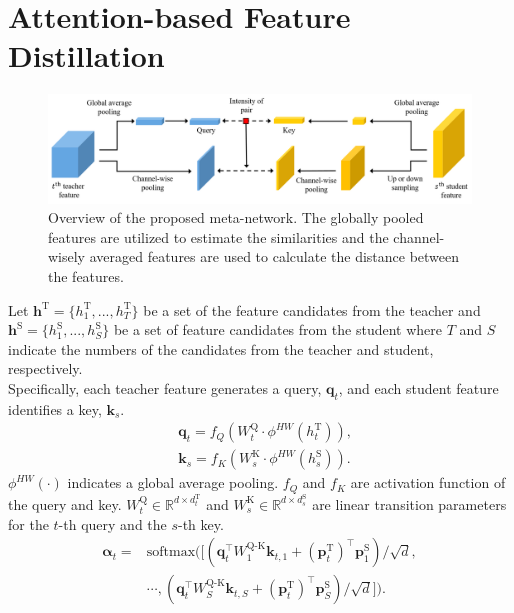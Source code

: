 \documentclass{article}
\begin{document}
	\section{Attention-based Feature Distillation}
	\begin{figure}[t]
		\centering
		\includegraphics[width=\columnwidth]{figure/Figure2_intensity.png}
		\caption{Overview of the proposed meta-network. The globally pooled features are utilized to estimate the similarities and the channel-wisely averaged features are used to calculate the distance between the features.}
		\label{fig:method}
	\end{figure}
	Let $\mathbf{h}^{\text{T}}=\{{h}^{\text{T}}_1, ..., {h}^{\text{T}}_T\}$ be a set of the feature candidates from the teacher and $\mathbf{h}^{\text{S}}=\{{h}^{\text{S}}_1, ..., {h}^{\text{S}}_S\}$ be a set of feature candidates from the student where $T$ and $S$ indicate the numbers of the candidates from the teacher and student, respectively.\\
	Specifically, each teacher feature generates a query, $\mathbf{q}_t$, and each student feature identifies a key, $\mathbf{k}_{s}$. \\
	\begin{equation}
		\begin{aligned}
			& \mathbf{q}_t = f_Q ( W^{\text{Q}}_t \cdot \phi^{HW}({h}^{\text{T}}_t) ), \\
			& \mathbf{k}_{s} = f_K ( W^{\text{K}}_s \cdot \phi^{HW}({h}^{\text{S}}_s) ).
		\end{aligned}
	\end{equation}
	$\phi^{HW}( \cdot )$ indicates a global average pooling. $f_Q$ and $f_K$ are activation function of the query and key. $W^{\text{Q}}_t \in \mathbb{R}^{d \times d^{\text{T}}_t}$ and $W^{\text{K}}_s \in \mathbb{R}^{d \times d^{\text{S}}_s}$ are linear transition parameters for the $t$-th query and the $s$-th key.\\
	\begin{equation}
		\begin{aligned}
			\mathbf{\alpha}_t={}&\text{softmax} ( [(\mathbf{q}_t^\top W_1^ {\text{Q-K}} \mathbf{k}_{t,1} + (\mathbf{p}_t^{\text{T}})^\top \mathbf{p}_{1}^{\text{S}}) / \sqrt{d}, \\
			& \cdots , (\mathbf{q}_t^\top W_S^{\text{Q-K}}\mathbf{k}_{t,S} + (\mathbf{p}_t^{\text{T}})^\top \mathbf{p}_{S}^{\text{S}}) / \sqrt{d} ]).
		\end{aligned}
	\end{equation}
\end{document}
